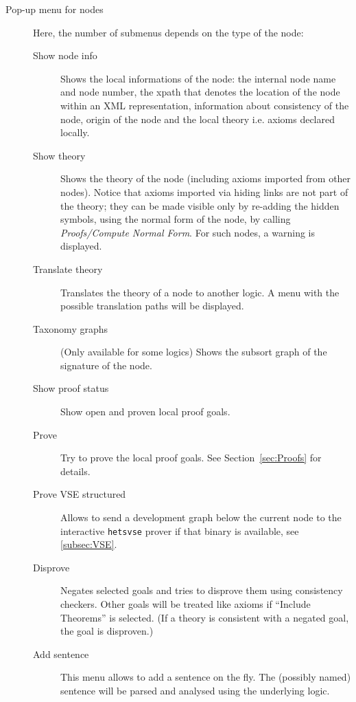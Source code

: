 \documentclass{article}
\begin{document}
\begin{description}
\begin{description}
\end{description}

\item[Pop-up menu for nodes]
Here, the number of submenus depends on the type of the node:
\begin{description}

\item[Show node info] Shows the local informations of the node: the internal
  node name and node number, the xpath that denotes the location of the node
  within an XML representation, information about consistency of the node,
  origin of the node and the local theory i.e. axioms declared locally.

\item[Show theory] Shows the theory of the node (including axioms
imported from other nodes). Notice that axioms imported via hiding  links
are not part of the theory; they can be made visible only by re-adding
the hidden symbols, using the normal form of the node, by calling
\emph{Proofs/Compute Normal Form}. For such nodes, a warning is displayed.

\item[Translate theory] Translates the theory of a node to another logic.
A menu with the possible translation paths will be displayed.

\item[Taxonomy graphs] (Only available for some logics) Shows the subsort graph
 of the signature of the node.

\item[Show proof status] Show open and proven local proof goals.
\item[Prove] Try to prove the local proof goals. See Section~\ref{sec:Proofs}
for details.

\item[Prove VSE structured] Allows to send a development graph below the
  current node to the interactive \texttt{hetsvse} prover if that binary is
  available, see \ref{subsec:VSE}.

\item[Disprove] Negates selected goals and tries to disprove them using
  consistency checkers. Other goals will be treated like axioms if ``Include
  Theorems'' is selected. (If a theory is consistent with a negated goal, the
  goal is disproven.)

\item[Add sentence] This menu allows to add a sentence on the fly. The
  (possibly named) sentence will be parsed and analysed using the underlying logic.


\end{description}
\end{description}
\end{document}
